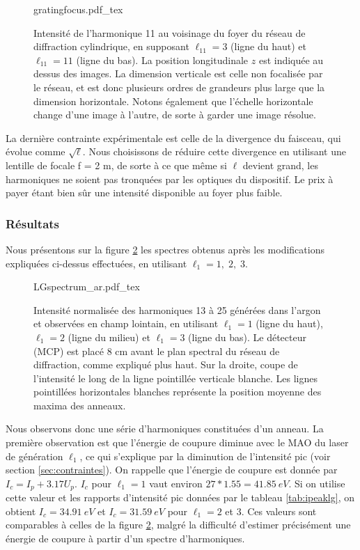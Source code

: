 \begin{figure}[!ht]
\centering
\def\svgwidth{1.1\columnwidth}
{gratingfocus.pdf_tex}
\caption{Intensité de l'harmonique 11 au voisinage du foyer du réseau de diffraction cylindrique, en supposant $\ell_{11} = 3$ (ligne du haut) et $\ell_{11} = 11$ (ligne du bas). La position longitudinale $z$ est indiquée au dessus des images. La dimension verticale est celle non focalisée par le réseau, et est donc plusieurs ordres de grandeurs plus large que la dimension horizontale. Notons également que l'échelle horizontale change d'une image à l'autre, de sorte à garder une image résolue.}
\label{Fig:gratingfocus}
\end{figure}

La dernière contrainte expérimentale est celle de la divergence du faisceau, qui évolue comme $\sqrt{\ell}$. Nous choisissons de réduire cette divergence en utilisant une lentille de focale f = 2 m, de sorte à ce que même si $\ell$ devient grand, les harmoniques ne soient pas tronquées par les optiques du dispositif. Le prix à payer étant bien sûr une intensité disponible au foyer plus faible. 

\subsubsection{Résultats}
\label{sec:results_lg}
Nous présentons sur la figure \ref{Fig:LGSpectrumAr} les spectres obtenus après les modifications expliquées ci-dessus effectuées, en utilisant $\ell_{1} = 1,\;2,\;3$. 

\begin{figure}[!ht]
\centering
\def\svgwidth{1\columnwidth}
{LGspectrum_ar.pdf_tex}
\caption{Intensité normalisée des harmoniques 13 à 25 générées dans l'argon et observées en champ lointain, en utilisant $\ell_{1} = 1$ (ligne du haut), $\ell_{1} = 2$ (ligne du milieu) et $\ell_{1} = 3$ (ligne du bas). Le détecteur (MCP) est placé 8 cm avant le plan spectral du réseau de diffraction, comme expliqué plus haut. Sur la droite, coupe de l'intensité le long de la ligne pointillée verticale blanche. Les lignes pointillées horizontales blanches représente la position moyenne des maxima des anneaux.}
\label{Fig:LGSpectrumAr}
\end{figure}

Nous observons donc une série d'harmoniques constituées d'un anneau. La première observation est que l'énergie de coupure diminue avec le MAO du laser de génération $\ell_{1}$, ce qui s'explique par la diminution de l'intensité pic (voir section \ref{sec:contraintes}). On rappelle que l'énergie de coupure est donnée par $I_c = I_p+3.17U_p$. $I_c$ pour $\ell_{1} = 1$ vaut environ $27*1.55=\SI{41.85}{eV}$. Si on utilise cette valeur et les rapports d'intensité pic données par le tableau \ref{tab:ipeaklg}, on obtient $I_c=\SI{34.91}{eV}$ et $I_c=\SI{31.59}{eV}$ pour $\ell_{1} = 2$ et 3. Ces valeurs sont comparables à celles de la figure \ref{Fig:LGSpectrumAr}, malgré la difficulté d'estimer précisément une énergie de coupure à partir d'un spectre d'harmoniques. 

